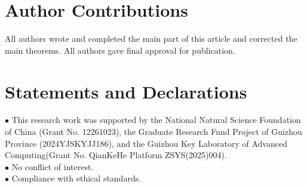 \documentclass[sn-mathphys-num]{sn-jnl}%
\theoremstyle{thmstyleone}%
\theoremstyle{thmstyletwo}%
\theoremstyle{thmstylethree}%
\begin{document}
\section*{Author Contributions} All authors wrote and completed the main part of this article and corrected the main theorems. All authors gave final approval for publication.

\section*{Statements and Declarations}
\(\bullet\) This research work was supported by the National Natural Science Foundation of China (Grant No. 12261023), the Graduate Research Fund Project of Guizhou Province (2024YJSKYJJ186), and the Guizhou Key Laboratory of Advanced Computing(Grant No. QianKeHe Platform ZSYS(2025)004).\\
\(\bullet\) No conflict of interest.\\
\(\bullet\) Compliance with ethical standards.
\end{document}
